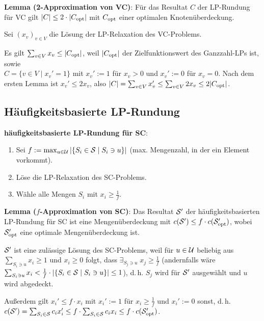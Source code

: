 \linie

\textbf{Lemma (2-Approximation von VC)}:
Für das Resultat $C$ der LP-Rundung für VC gilt $|C| \le 2 \cdot |C_\opt|$
mit $C_\opt$ einer optimalen Knotenüberdeckung.

\begin{Beweis}
    Sei $(x_v)_{v \in V}$ die Lösung der LP-Relaxation des VC-Problems.

    Es gilt $\sum_{v \in V} x_v \le |C_\opt|$,
    weil $|C_\opt|$ der Zielfunktionswert des Ganzzahl-LPs ist, sowie\\
    $C = \{v \in V \;|\; x_v' = 1\}$ mit
    $x_v' := 1$ für $x_v > 0$ und
    $x_v' := 0$ für $x_v = 0$.
    Nach dem ersten Lemma ist $x_v' \le 2x_v$,
    also $|C| = \sum_{v \in V} x_v' \le \sum_{v \in V} 2x_v \le 2 |C_\opt|$.
\end{Beweis}

\pagebreak

\subsection{%
    Häufigkeitsbasierte LP-Rundung%
}

\textbf{häufigkeitsbasierte LP-Rundung für SC}:
\begin{enumerate}
    \item
    Sei $f := \max_{u \in \U} |\{S_i \in \S \;|\; S_i \ni u\}|$
    (max. Mengenzahl, in der ein Element vorkommt).

    \item
    Löse die LP-Relaxation des SC-Problems.

    \item
    Wähle alle Mengen $S_i$ mit $x_i \ge \frac{1}{f}$.
\end{enumerate}

\linie

\textbf{Lemma ($f$-Approximation von SC)}:
Das Resultat $\S'$ der häufigkeitsbasierten LP-Rundung für SC ist eine Mengenüberdeckung mit
$c(\S') \le f \cdot c(\S'_\opt)$, wobei $\S'_\opt$ eine optimale Mengenüberdeckung ist.

\begin{Beweis}
    $\S'$ ist eine zulässige Lösung des SC-Problems, weil
    für $u \in \U$ beliebig
    aus $\sum_{S_i \ni u} x_i \ge 1$ und $x_i \ge 0$ folgt, dass
    $\exists_{S_j \ni u}\; x_j \ge \frac{1}{f}$
    (andernfalls wäre
    $\sum_{S_i \ni u} x_i < \frac{1}{f} \cdot |\{S_i \in \S \;|\; S_i \ni u\}| \le 1$),
    d.\,h. $S_j$ wird für $\S'$ ausgewählt und $u$ wird abgedeckt.

    Außerdem gilt $x_i' \le f \cdot x_i$ mit $x_i' := 1$ für $x_i \ge \frac{1}{f}$ und
    $x_i' := 0$ sonst, d.\,h.\\
    $c(\S') = \sum_{S_i \in \S} c_i x_i' \le f \cdot \sum_{S_i \in \S} c_i x_i \le
    f \cdot c(\S'_\opt)$.
\end{Beweis}

